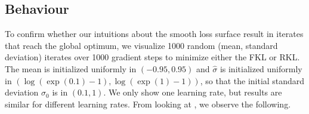 \documentclass[\main/thesis.tex]{subfiles}
\begin{document}
  

\subsection{Behaviour}
To confirm whether our intuitions about the smooth loss surface result in iterates that reach the global optimum, we visualize 1000 random (mean, standard deviation) iterates over 1000 gradient steps to minimize either the FKL or RKL. The mean is initialized uniformly in $(-0.95, 0.95)$ and $\hat{\sigma}$ is initialized uniformly in $(\log(\exp(0.1) - 1), \log(\exp(1) - 1))$, so that the initial standard deviation $\sigma_0$ is in $(0.1, 1)$. We only show one learning rate, but results are similar for different learning rates. From looking at , we observe the following.
\end{document}
